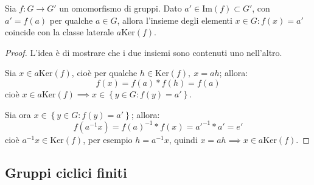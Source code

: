 \documentclass[11pt, a4paper]{scrartcl}
\theoremstyle{definition}
\numberwithin{esempio}{section}
\theoremstyle{definition}
\numberwithin{obs}{section}
\numberwithin{nota}{section}
\numberwithin{equation}{subsection}
\begin{document}
\begin{teorema}
	{}{}
	Sia $f : G \to G'$ un omomorfismo di gruppi. Dato $a' \in \mathrm{Im} (f) \subset G'$, con $a'= f(a)$ per qualche $ a \in G$, allora l'insieme degli elementi $x \in G : f(x ) = a'$ coincide con la classe laterale $a  \mathrm{Ker} (f)$.
	\begin{proof}
L'idea \`e di mostrare che i due insiemi sono contenuti uno nell'altro.

Sia $x \in a\mathrm{Ker} (f)$, cio\`e per qualche $h \in \mathrm{Ker} (f), \ x = ah$; allora:
\[
f(x) = f(a) *  f(h) = f(a)
\] 
cio\`e $x \in a \mathrm{Ker} (f) \implies x \in \left\{ y \in G : f(y) = a' \right\} $.

Sia ora $x \in \left\{ y \in G : f(y) = a' \right\} $; allora:
\[
	f(a^{-1} x) = f(a) ^{-1}*  f(x)  = a'^{-1} * a'= e'
\] 
cio\`e $a^{-1} x \in \mathrm{Ker} (f)$, per esempio $h = a^{-1} x$, quindi $x = ah\implies x \in a \mathrm{Ker} (f)$.
	\end{proof}
\end{teorema}
\subsection{Gruppi ciclici finiti}
\end{document}
